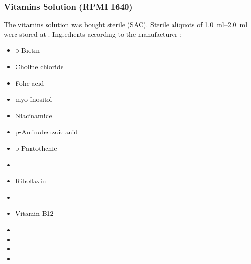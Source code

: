 \subsubsection{Vitamins Solution (RPMI 1640)}
The vitamins solution was bought sterile (SAC). Sterile aliquots of \SIrange{1.0}{2.0}{\milli\litre} were stored at . Ingredients according to the manufacturer \cite{SigmaRPMI1640}:
\begin{itemize}
	\item {} \textsc{d}-Biotin
	\item {} Choline chloride
	\item {} Folic acid
	\item {} myo-Inositol
	\item {} Niacinamide
	\item {} p-Aminobenzoic acid
	\item {} \textsc{d}-Pantothenic 
	\item {} 
	\item {} Riboflavin
	\item {} 
	\item {} Vitamin B12
	\item {} 
	\item {} 
	\item {} 
	\item {} 
\end{itemize}

